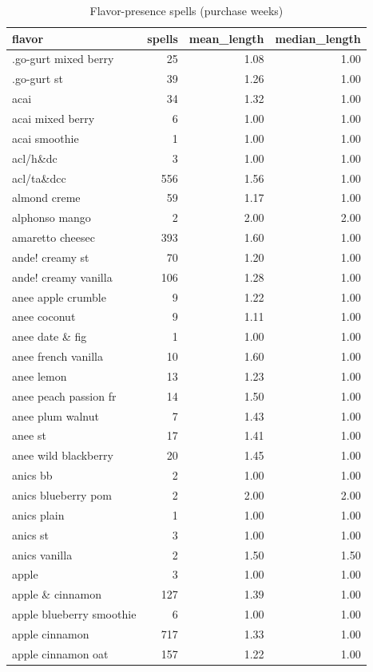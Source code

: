 \begin{table}
\caption{Flavor-presence spells (purchase weeks)}
\begin{tabular}{lrrr}
\toprule
flavor & spells & mean\_length & median\_length \\
\midrule
.go-gurt mixed berry & 25 & 1.08 & 1.00 \\
.go-gurt st & 39 & 1.26 & 1.00 \\
acai & 34 & 1.32 & 1.00 \\
acai mixed berry & 6 & 1.00 & 1.00 \\
acai smoothie & 1 & 1.00 & 1.00 \\
acl/h\&dc & 3 & 1.00 & 1.00 \\
acl/ta\&dcc & 556 & 1.56 & 1.00 \\
almond creme & 59 & 1.17 & 1.00 \\
alphonso mango & 2 & 2.00 & 2.00 \\
amaretto cheesec & 393 & 1.60 & 1.00 \\
ande! creamy st & 70 & 1.20 & 1.00 \\
ande! creamy vanilla & 106 & 1.28 & 1.00 \\
anee apple crumble & 9 & 1.22 & 1.00 \\
anee coconut & 9 & 1.11 & 1.00 \\
anee date \& fig & 1 & 1.00 & 1.00 \\
anee french vanilla & 10 & 1.60 & 1.00 \\
anee lemon & 13 & 1.23 & 1.00 \\
anee peach passion fr & 14 & 1.50 & 1.00 \\
anee plum walnut & 7 & 1.43 & 1.00 \\
anee st & 17 & 1.41 & 1.00 \\
anee wild blackberry & 20 & 1.45 & 1.00 \\
anics bb & 2 & 1.00 & 1.00 \\
anics blueberry pom & 2 & 2.00 & 2.00 \\
anics plain & 1 & 1.00 & 1.00 \\
anics st & 3 & 1.00 & 1.00 \\
anics vanilla & 2 & 1.50 & 1.50 \\
apple & 3 & 1.00 & 1.00 \\
apple \& cinnamon & 127 & 1.39 & 1.00 \\
apple blueberry smoothie & 6 & 1.00 & 1.00 \\
apple cinnamon & 717 & 1.33 & 1.00 \\
apple cinnamon oat & 157 & 1.22 & 1.00 \\

\end{tabular}
\end{table}
